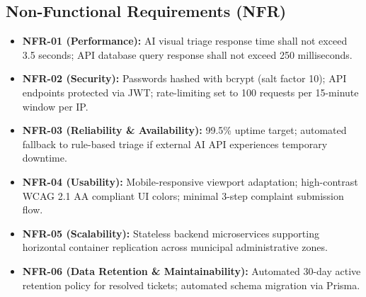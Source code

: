 \documentclass[11pt,a4paper]{article}
\begin{document}
\subsection{Non-Functional Requirements (NFR)}
\begin{itemize}[leftmargin=1.5em]
    \item \textbf{NFR-01 (Performance):} AI visual triage response time shall not exceed 3.5 seconds; API database query response shall not exceed 250 milliseconds.
    \item \textbf{NFR-02 (Security):} Passwords hashed with bcrypt (salt factor 10); API endpoints protected via JWT; rate-limiting set to 100 requests per 15-minute window per IP.
    \item \textbf{NFR-03 (Reliability \& Availability):} 99.5\% uptime target; automated fallback to rule-based triage if external AI API experiences temporary downtime.
    \item \textbf{NFR-04 (Usability):} Mobile-responsive viewport adaptation; high-contrast WCAG 2.1 AA compliant UI colors; minimal 3-step complaint submission flow.
    \item \textbf{NFR-05 (Scalability):} Stateless backend microservices supporting horizontal container replication across municipal administrative zones.
    \item \textbf{NFR-06 (Data Retention \& Maintainability):} Automated 30-day active retention policy for resolved tickets; automated schema migration via Prisma.
\end{itemize}
\end{document}

